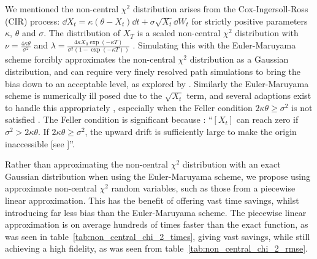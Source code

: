 \documentclass[manuscript,review]{acmart}
\begin{document}
We mentioned the non-central $ \chi^2 $ distribution arises from the Cox-Ingersoll-Ross (CIR) process: $ \dd{X_t} = \kappa (\theta - X_t) \dd{t} + \sigma \sqrt{X_t} \dd{W_t} $ for strictly positive parameters $ \kappa $, $ \theta $ and $ \sigma $. The distribution of $ X_T $ is a scaled non-central $ \chi^2 $ distribution with $ \nu = \tfrac{4\kappa\theta}{\sigma^2} $ and $ \lambda = \tfrac{4\kappa X_0 \exp(-\kappa T)}{\sigma^2(1 - \exp(-\kappa T))} $ \citep{cox1985theory} \citep[pages~67--68]{munk2011fixed}. Simulating this with the Euler-Maruyama scheme forcibly approximates the non-central $ \chi^2 $ distribution as a Gaussian distribution, and can require very finely resolved path simulations to bring the bias down to an acceptable level, as explored by \citet{broadie2006exact}. Similarly the Euler-Maruyama scheme is numerically ill posed due to the $ \sqrt{X_t} $ term, and several adaptions exist to handle this appropriately \citep{deelstra1998convergence,lord2010comparison,berkaoui2008euler,higham2002strong,alfonsi2005discretization,alfonsi2008second,alfonsi2010high,dereich2012euler,cozma2020strong_euler,gyongy2011note}, especially when the Feller condition $ 2\kappa\theta \geq \sigma^2 $ is not satisfied \citep{feller1951two,gyongy1998note}. The Feller condition is significant because \citep[page~391]{cox1985theory}: ``\textit{$ [X_t] $} can reach zero if $ \sigma^2 > 2\kappa \theta $. If $ 2 \kappa \theta \geq \sigma^2 $, the upward drift is sufficiently large to make the origin inaccessible [see \citet{feller1951two}]''.

Rather than approximating the non-central $ \chi^2 $ distribution with an exact Gaussian distribution when using the Euler-Maruyama scheme, we propose using approximate non-central $ \chi^2 $ random variables, such as those from a piecewise linear approximation. This has the benefit of offering vast time savings, whilst introducing far less bias than the Euler-Maruyama scheme. The piecewise linear approximation is on average hundreds of times faster than the exact function, as was seen in table~\ref{tab:non_central_chi_2_times}, giving vast savings, while still achieving a high fidelity, as was seen from table~\ref{tab:non_central_chi_2_rmse}.
\end{document}
